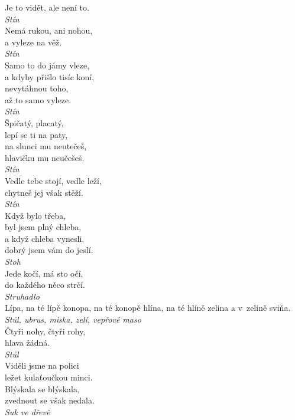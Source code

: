 \begin{multicols}{\value{columnsthindata}}
\noindent
Je to vidět, ale není to.\\[1 mm]
{\sl Stín}\\

\noindent
Nemá rukou, ani nohou,\\
a vyleze na věž.\\[1 mm]
{\sl Stín}\\

\noindent
Samo to do jámy vleze,\\
a kdyby přišlo tisíc koní,\\
nevytáhnou toho,\\
až to samo vyleze.\\[1 mm]
{\sl Stín}\\

\noindent
Špičatý, placatý,\\
lepí se ti na paty,\\
na slunci mu neutečeš,\\
hlavičku mu neučešeš.\\[1 mm]
{\sl Stín}\\

\noindent
Vedle tebe stojí, vedle leží,\\
chytneš jej však stěží.\\[1 mm]
{\sl Stín}\\

\noindent
Když bylo třeba,\\
byl jsem plný chleba,\\
a když chleba vynesli,\\
dobrý jsem vám do jeslí.\\[1 mm]
{\sl Stoh}\\

\noindent
Jede kočí, má sto očí,\\
do každého něco strčí.\\[1 mm]
{\sl Struhadlo}\\

\noindent
Lípa, na té lípě konopa, na té konopě hlína, na té hlíně
zelina a v~zelině sviňa.\\[1 mm]
{\sl Stůl, ubrus, miska, zelí, vepřové maso}\\

\noindent
Čtyři nohy, čtyři rohy,\\
hlava žádná.\\[1 mm]
{\sl Stůl}\\

\noindent
Viděli jsme na polici\\
ležet kulaťoučkou minci.\\
Blýskala se blýskala,\\
zvednout se však nedala.\\[1 mm]
{\sl Suk ve dřevě}\\


\end{multicols}
